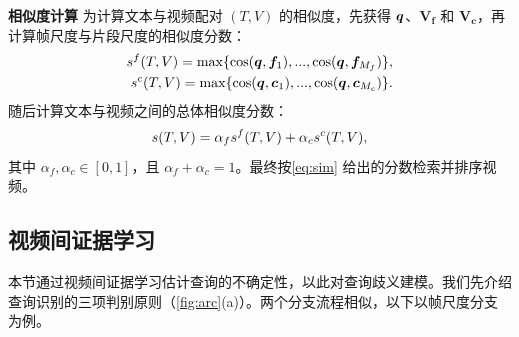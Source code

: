 \noindent \textbf{相似度计算} \quad
为计算文本与视频配对 $(T, V)$ 的相似度，先获得 $\bm{q}$、$\bm{V_f}$ 和 $\bm{V_c}$，再计算帧尺度与片段尺度的相似度分数：
\vspace{-.6em}
\begin{equation}
\begin{aligned}
s^f(T, V) = \text{max} \{ \text{cos}(\bmq, \bmf_1),..., \text{cos}(\bmq, \bmf_{M_f})\}, \\
s^c(T, V) = \text{max} \{\text{cos}(\bmq, \bmc_1),..., \text{cos}(\bmq, \bmc_{M_c})\}.
\label{eq:simscore}
\end{aligned}
\vspace{-.6em}
\end{equation}
随后计算文本与视频之间的总体相似度分数：
\vspace{-.6em}
\begin{equation}\label{eq:sim}
s({T}, {V}) = \alpha_f s^f({T}, {V}) + \alpha_c s^c({T}, {V}),
\vspace{-.6em}
\end{equation}
其中 $\alpha_f, \alpha_c \in [0,1]$，且 $\alpha_f + \alpha_c = 1$。最终按\cref{eq:sim} 给出的分数检索并排序视频。

\subsection{视频间证据学习}
本节通过视频间证据学习估计查询的不确定性，以此对查询歧义建模。我们先介绍查询识别的三项判别原则（\cref{fig:arc}(a)）。两个分支流程相似，以下以帧尺度分支为例。

